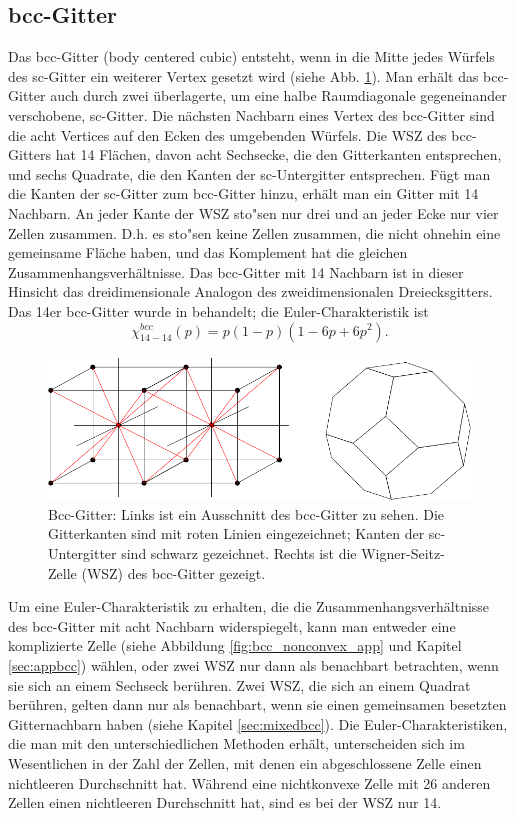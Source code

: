 \subsection{bcc-Gitter}
Das bcc-Gitter (body centered cubic) entsteht, wenn in die Mitte jedes W\"urfels des sc-Gitter ein weiterer Vertex gesetzt wird (siehe Abb. \ref{fig:bcc}). Man erh\"alt das bcc-Gitter auch durch zwei \"uberlagerte, um eine halbe Raumdiagonale gegeneinander verschobene, sc-Gitter. Die n\"achsten Nachbarn eines Vertex des bcc-Gitter sind die acht Vertices auf den Ecken des umgebenden W\"urfels. Die WSZ des bcc-Gitters hat 14 Fl\"achen, davon acht Sechsecke, die den Gitterkanten entsprechen, und sechs Quadrate, die den Kanten der sc-Untergitter entsprechen. 
F\"ugt man die Kanten der sc-Gitter zum bcc-Gitter hinzu, erh\"alt man ein Gitter mit 14 Nachbarn. An jeder Kante der WSZ sto"sen nur drei und an jeder Ecke nur vier Zellen zusammen. D.h. es sto"sen keine Zellen zusammen, die nicht ohnehin eine gemeinsame Fl\"ache haben, und das Komplement hat die gleichen Zusammenhangsverh\"altnisse. Das bcc-Gitter mit 14 Nachbarn ist in dieser Hinsicht das dreidimensionale Analogon des zweidimensionalen Dreiecksgitters. Das 14er bcc-Gitter wurde in \cite{Likos:95} behandelt; die Euler-Charakteristik ist
\begin{equation}
  \chi_{14-14}^{bcc}(p)=p(1-p)(1-6p+6p^2).
\end{equation}
\begin{figure}[tbp]
  \centering
  \includegraphics{./Schranken-figs/bcc}
  \caption{Bcc-Gitter: Links ist ein Ausschnitt des bcc-Gitter zu sehen. Die Gitterkanten sind mit roten Linien eingezeichnet; Kanten der sc-Untergitter sind schwarz gezeichnet. Rechts ist die Wigner-Seitz-Zelle (WSZ) des bcc-Gitter gezeigt.}
  \label{fig:bcc}
\end{figure}Um eine Euler-Charakteristik zu erhalten, die die Zusammenhangsverh\"altnisse des bcc-Gitter mit acht Nachbarn widerspiegelt, kann man entweder eine komplizierte Zelle (siehe Abbildung \ref{fig:bcc_nonconvex_app} und Kapitel \ref{sec:appbcc}) w\"ahlen, oder zwei WSZ nur dann als benachbart betrachten, wenn sie sich an einem Sechseck ber\"uhren. Zwei WSZ, die sich an einem Quadrat ber\"uhren, gelten dann nur als benachbart, wenn sie einen gemeinsamen besetzten Gitternachbarn haben (siehe Kapitel \ref{sec:mixedbcc}). Die Euler-Charakteristiken, die man mit den unterschiedlichen Methoden erh\"alt, unterscheiden sich im Wesentlichen in der Zahl der Zellen, mit denen ein abgeschlossene Zelle einen nichtleeren Durchschnitt hat. W\"ahrend eine nichtkonvexe Zelle mit 26 anderen Zellen einen nichtleeren Durchschnitt hat, sind es bei der WSZ nur 14. 
